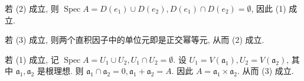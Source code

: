 \documentclass{article}
\theoremstyle{exercise}
\newenvironment{proofc}{\proof}{\endproof}
\def\ga{\mathfrak{a}}
\def\Spec{\operatorname{Spec}}
\begin{document}
\begin{proofc}
  若 (2) 成立,
  则 $\Spec A = D(e_1) \cup D(e_2), D(e_1) \cap D(e_2) = \emptyset$, 因此 (1) 成立.

  若 (3) 成立, 则两个直积因子中的单位元即是正交幂等元, 从而 (2) 成立.

  若 (1) 成立, 记 $\Spec A = U_1 \cup U_2, U_1 \cap U_2 = \emptyset$.
  设 $U_1 = V(\ga_1), U_2 = V(\ga_2)$, 其中 $\ga_1, \ga_2$ 是根理想.
  则 $\ga_1 \cap \ga_2 = 0, \ga_1 + \ga_2 = A$. 因此 $A = \ga_1 \times \ga_2$.
  从而 (3) 成立.
\end{proofc}
\end{document}
